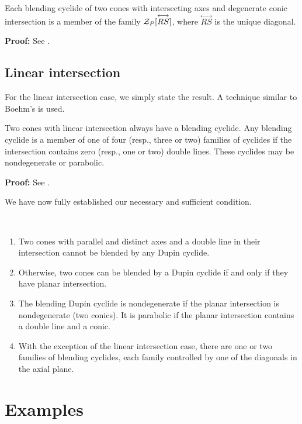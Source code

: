 \begin{lemma}
\label{lemma:1-parabolic}
     Each blending cyclide of two cones with intersecting
axes and degenerate conic intersection is a member of the family
${\cal Z}_P[\stackrel{\longleftrightarrow}{RS}]$,
where $\stackrel{\longleftrightarrow}{RS}$ is the unique diagonal.
\end{lemma}
{\bf Proof:} 
See \cite[Lemma~5.19]{shenethesis}.
\QED

\subsection{Linear intersection}
\label{section:cyc-linear}

For the linear intersection case, we simply state the result.
A technique similar to Boehm's \cite{boehm:1990} is used.

\begin{lemma}
\label{thm:linear-inter-blending}
     Two cones with linear intersection always have a blending cyclide.
Any blending cyclide is a member of one of four (resp., three or two) families
of cyclides if the intersection contains zero (resp., one or two) double
lines.  These cyclides may be nondegenerate or parabolic.
\end{lemma}
{\bf Proof:} See \cite[Section~5.9]{shenethesis}.
\QED

We have now fully established our necessary and sufficient condition.

\begin{theorem}\ 
\begin{enumerate}
\item
Two cones with parallel and distinct axes and a double line in their
intersection cannot be blended by any Dupin cyclide.
\item
Otherwise, two cones can be blended by a Dupin cyclide if and only if 
they have planar intersection.
\item
The blending Dupin cyclide is nondegenerate if the planar
intersection is nondegenerate (two conics).
It is parabolic if the planar 
intersection contains a double line and a conic.
\item
With the exception of the linear intersection case,
there are one or two families of blending cyclides, each family 
controlled by one of the diagonals in the axial plane. 
\end{enumerate}
\end{theorem}

\section{Examples}
\label{section:eg}

